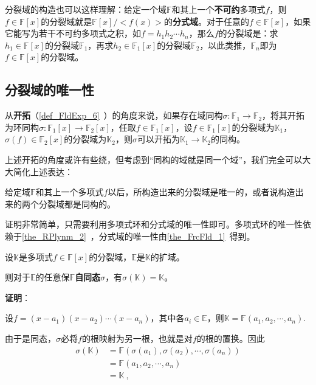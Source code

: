 分裂域的构造也可以这样理解：给定一个域$\mathbb{F}$和其上一个\textbf{不可约}多项式$f$，则$f\in\mathbb{F}[x]$的分裂域就是$\mathbb{F}[x]/<f(x)>$的\textbf{分式域}。对于任意的$f\in\mathbb{F}[x]$，如果它能写为若干不可约多项式之积，如$f=h_1h_2\cdots h_n$，那么$f$的分裂域是：求$h_1\in\mathbb{F}[x]$的分裂域$\mathbb{F}_1$，再求$h_2\in\mathbb{F}_1[x]$的分裂域$\mathbb{F}_2$，以此类推，$\mathbb{F}_n$即为$f\in\mathbb{F}[x]$的分裂域。










\subsection{分裂域的唯一性}

从\textbf{开拓}（\autoref{def_FldExp_6}~）的角度来说，如果存在域同构$\sigma:\mathbb{F}_1\to\mathbb{F}_2$，将其开拓为环同构$\sigma:\mathbb{F}_1[x]\to\mathbb{F}_2[x]$，任取$f\in\mathbb{F}_1[x]$，设$f\in\mathbb{F}_1[x]$的分裂域为$\mathbb{K}_1$，$\sigma(f)\in\mathbb{F}_2[x]$的分裂域为$\mathbb{K}_2$，则$\sigma$可以开拓为$\mathbb{K}_1\to\mathbb{K}_2$的同构。

上述开拓的角度或许有些绕，但考虑到“同构的域就是同一个域”，我们完全可以大大简化上述表达：

\begin{theorem}{}
给定域$\mathbb{F}$和其上一个多项式$f$以后，所构造出来的分裂域是唯一的，或者说构造出来的两个分裂域都是同构的。
\end{theorem}

证明非常简单，只需要利用多项式环和分式域的唯一性即可。多项式环的唯一性依赖于\autoref{the_RPlynm_2}~，分式域的唯一性由\autoref{the_FrcFld_1}~得到。





\begin{theorem}{}\label{the_SpltFd_3}
设$\mathbb{K}$是多项式$f\in\mathbb{F}[x]$的分裂域，$\mathbb{E}$是$\mathbb{K}$的扩域。

则对于$\mathbb{E}$的任意保$\mathbb{F}$\textbf{自同态}$\sigma$，有$\sigma(\mathbb{K})=\mathbb{K}$。
\end{theorem}

\textbf{证明}：

设$f=(x-a_1)(x-a_2)\cdots(x-a_n)$，其中各$a_i\in\mathbb{E}$，则$\mathbb{K}=\mathbb{F}(a_1, a_2, \cdots, a_n)$.

由于是同态，$\sigma$必将$f$的根映射为另一根，也就是对$f$的根的置换。因此
\begin{equation}
\begin{aligned}
\sigma(\mathbb{K})&=\mathbb{F}(\sigma(a_1), \sigma(a_2), \cdots, \sigma(a_n))\\
&=\mathbb{F}(a_1, a_2, \cdots, a_n)\\
&=\mathbb{K}~,
\end{aligned}
\end{equation}

